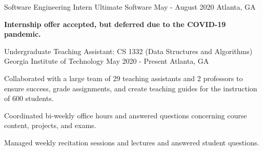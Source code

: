 

\begin{cventries}

\cventry
{Software Engineering Intern}
{Ultimate Software}
{May - August 2020}
{Atlanta, GA}
{
\begin{cvitems}
\item \textbf{Internship offer accepted, but deferred due to the COVID-19 pandemic.}
\end{cvitems}
}

\cventry
{Undergraduate Teaching Assistant: CS 1332 (Data Structures and Algorithms)} %
{Georgia Institute of Technology} %
{May 2020 - Present} %
{Atlanta, GA} %
{ %
\begin{cvitems}
\item Collaborated with a large team of 29 teaching assistants and 2 professors
to ensure success, grade assignments, and create teaching guides
for the instruction of 600 students.
\item Coordinated bi-weekly office hours and answered
questions concerning course content, projects, and exams.
\item Managed weekly recitation sessions and lectures and answered student questions.
\end{cvitems}
}




\end{cventries}
